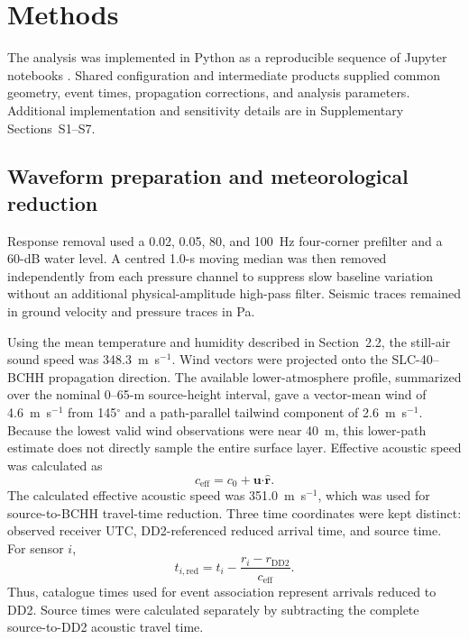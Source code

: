 \documentclass[]{seismica}
\begin{document}
\FloatBarrier

\section{Methods}
\label{sec:methods}

The analysis was implemented in Python as a reproducible sequence of Jupyter
notebooks \citep{kluyver2016jupyter}. Shared configuration and intermediate
products supplied common geometry, event times, propagation corrections, and
analysis parameters. Additional implementation and sensitivity details are in
Supplementary Sections~S1--S7.

\subsection{Waveform preparation and meteorological reduction}

Response removal used a 0.02, 0.05, 80, and 100~Hz four-corner prefilter and a
60-dB water level. A centred 1.0-s moving median was then removed independently
from each pressure channel to suppress slow baseline variation without an
additional physical-amplitude high-pass filter. Seismic traces remained in
ground velocity and pressure traces in Pa.

Using the mean temperature and humidity described in Section~2.2, the
still-air sound speed was 348.3~m~s$^{-1}$. Wind vectors were projected onto
the SLC-40--BCHH propagation direction. The available lower-atmosphere profile,
summarized over the nominal 0--65-m source-height interval, gave a vector-mean
wind of 4.6~m~s$^{-1}$ from 145$^\circ$ and a path-parallel tailwind component
of 2.6~m~s$^{-1}$. Because the lowest valid wind observations were near 40~m,
this lower-path estimate does not directly sample the entire surface layer.
Effective acoustic speed was calculated as
\begin{equation}
 c_{\mathrm{eff}}=c_0+\mathbf{u}\boldsymbol{\cdot}\hat{\mathbf{r}}.
 \label{eq:effective_speed}
\end{equation}
The calculated effective acoustic speed was 351.0~m~s$^{-1}$, which was used
for source-to-BCHH travel-time reduction.
Three time coordinates were kept distinct: observed
receiver UTC, DD2-referenced reduced arrival time, and source time. For sensor
$i$,
\begin{equation}
 t_{i,\mathrm{red}}=t_i-\frac{r_i-r_{\mathrm{DD2}}}{c_{\mathrm{eff}}}.
 \label{eq:reduced_time}
\end{equation}
Thus, catalogue times used for event association represent arrivals reduced
to DD2. Source times were calculated separately by subtracting the complete
source-to-DD2 acoustic travel time.
\end{document}

